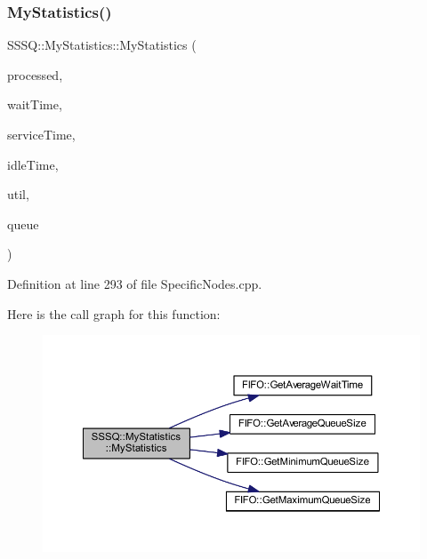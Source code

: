 \mbox{\label{class_s_s_s_q_1_1_my_statistics_af2e9214ebae8b846ae9beefbfb65f3de}} 
\subsubsection{\texorpdfstring{My\+Statistics()}{MyStatistics()}\hspace{0.1cm}{\footnotesize\ttfamily [2/2]}}
{\footnotesize\ttfamily S\+S\+S\+Q\+::\+My\+Statistics\+::\+My\+Statistics (\begin{DoxyParamCaption}\item[{int}]{processed,  }\item[{double}]{wait\+Time,  }\item[{double}]{service\+Time,  }\item[{double}]{idle\+Time,  }\item[{double}]{util,  }\item[{\hyperlink{class_f_i_f_o}{F\+I\+FO} $\ast$}]{queue }\end{DoxyParamCaption})\hspace{0.3cm}{\ttfamily [inline]}}



Definition at line 293 of file Specific\+Nodes.\+cpp.

Here is the call graph for this function\+:\nopagebreak
\begin{figure}[H]
\begin{center}
\leavevmode
\includegraphics[width=350pt]{class_s_s_s_q_1_1_my_statistics_af2e9214ebae8b846ae9beefbfb65f3de_cgraph}
\end{center}
\end{figure}


